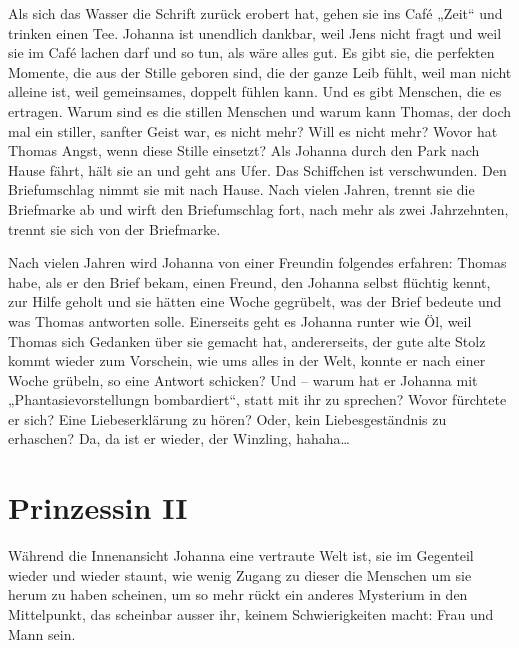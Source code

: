 \documentclass[10pt,a5paper]{book}
\begin{document}
Als sich das Wasser die Schrift zurück erobert hat, gehen sie ins Café „Zeit“ und trinken einen Tee. Johanna ist unendlich dankbar, weil Jens nicht fragt und weil sie im Café lachen darf und so tun, als wäre alles gut. Es gibt sie, die perfekten Momente, die aus der Stille geboren sind, die der ganze Leib fühlt, weil man nicht alleine ist, weil gemeinsames, doppelt fühlen kann. Und es gibt Menschen, die es ertragen. Warum sind es die stillen Menschen und warum kann Thomas, der doch mal ein stiller, sanfter Geist war, es nicht mehr? Will es nicht mehr? Wovor hat Thomas Angst, wenn diese Stille einsetzt? Als Johanna durch den Park nach Hause fährt, hält sie an und geht ans Ufer. Das Schiffchen ist verschwunden. Den Briefumschlag nimmt sie mit nach Hause. Nach vielen Jahren, trennt sie die Briefmarke ab und wirft den Briefumschlag fort, nach mehr als zwei Jahrzehnten, trennt sie sich von der Briefmarke.

Nach vielen Jahren wird Johanna von einer Freundin folgendes erfahren: Thomas habe, als er den Brief bekam, einen Freund, den Johanna selbst flüchtig kennt, zur Hilfe geholt und sie hätten eine Woche gegrübelt, was der Brief bedeute und was Thomas antworten solle. Einerseits geht es Johanna runter wie Öl, weil Thomas sich Gedanken über sie gemacht hat, andererseits, der gute alte Stolz kommt wieder zum Vorschein, wie ums alles in der Welt, konnte er nach einer Woche grübeln, so eine Antwort schicken? Und – warum hat er Johanna mit „Phantasievorstellungn bombardiert“, statt mit ihr zu sprechen? Wovor fürchtete er sich? Eine Liebeserklärung zu hören? Oder, kein Liebesgeständnis zu erhaschen? Da, da ist er wieder, der Winzling, hahaha\dots 



\section*{Prinzessin II}




Während die Innenansicht Johanna eine vertraute Welt ist, sie im Gegenteil wieder und wieder staunt, wie wenig Zugang zu dieser die Menschen um sie herum zu haben scheinen, um so mehr rückt ein anderes Mysterium in den Mittelpunkt, das scheinbar ausser ihr, keinem Schwierigkeiten macht: Frau und Mann sein.
\end{document}
